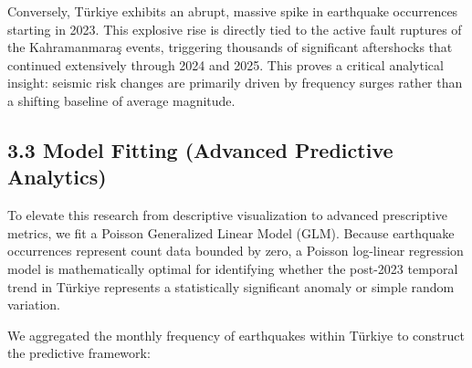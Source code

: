 \documentclass[
  11pt,
  a4paper,
  DIV=11,
  numbers=noendperiod]{scrartcl}
\begin{document}
Conversely, Türkiye exhibits an abrupt, massive spike in earthquake
occurrences starting in 2023. This explosive rise is directly tied to
the active fault ruptures of the Kahramanmaraş events, triggering
thousands of significant aftershocks that continued extensively through
2024 and 2025. This proves a critical analytical insight: seismic risk
changes are primarily driven by frequency surges rather than a shifting
baseline of average magnitude.

\subsection{3.3 Model Fitting (Advanced Predictive
Analytics)}\label{model-fitting-advanced-predictive-analytics}

To elevate this research from descriptive visualization to advanced
prescriptive metrics, we fit a Poisson Generalized Linear Model (GLM).
Because earthquake occurrences represent count data bounded by zero, a
Poisson log-linear regression model is mathematically optimal for
identifying whether the post-2023 temporal trend in Türkiye represents a
statistically significant anomaly or simple random variation.

We aggregated the monthly frequency of earthquakes within Türkiye to
construct the predictive framework:
\end{document}
